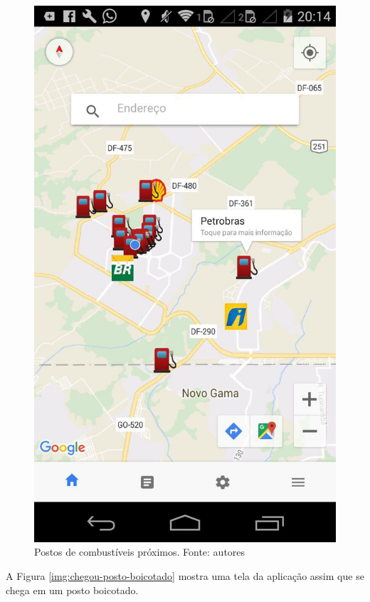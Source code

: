\begin{figure}[H]
    \centering
    \includegraphics[scale=0.2]{figuras/app_2.jpg}
    \caption[Postos de combustíveis próximos]{Postos de combustíveis próximos. Fonte: autores}
    \label{img:postos_de_gasolina_proximos}
\end{figure}

A Figura \ref{img:chegou-posto-boicotado} mostra uma tela da aplicação assim que se chega em um posto boicotado.


